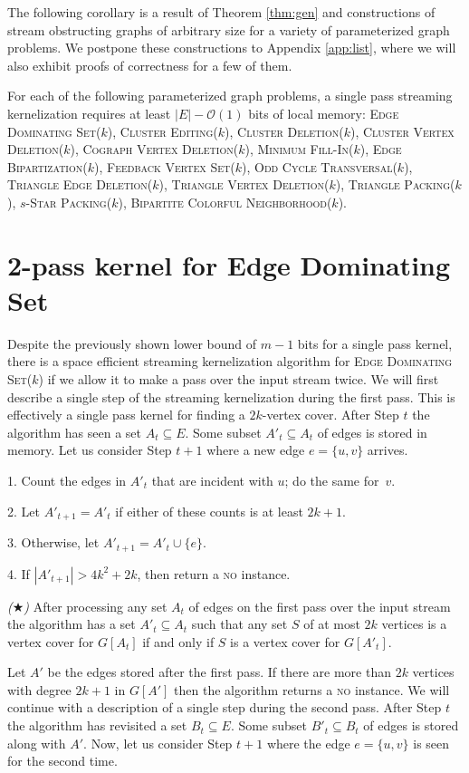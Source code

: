 \documentclass[draft,a4paper]{llncs}
\newcommand{\Oh}{\mathcal{O}}
\newcommand{\no}{\textsc{no}\xspace}
\newcommand{\EDSk}{\textsc{Edge Dominating Set($k$)}\xspace}
\newcommand{\CEk}{\textsc{Cluster Editing($k$)}\xspace}
\newcommand{\MFIk}{\textsc{Minimum Fill-In($k$)}\xspace}
\newcommand{\FBVSk}{\textsc{Feedback Vertex Set($k$)}\xspace}
\newcommand{\OCTk}{\textsc{Odd Cycle Transversal($k$)}\xspace}
\newcommand{\CVDk}{\textsc{Cluster Vertex Deletion($k$)}\xspace}
\newcommand{\CEDk}{\textsc{Cluster Deletion($k$)}\xspace}
\newcommand{\BERk}{\textsc{Edge Bipartization($k$)}\xspace}
\newcommand{\BCNk}{\textsc{Bipartite Colorful Neighborhood($k$)}\xspace}
\newcommand{\CoVDk}{\textsc{Cograph Vertex Deletion($k$)}\xspace}
\newcommand{\TEDk}{\textsc{Triangle Edge Deletion($k$)}\xspace}
\newcommand{\TVDk}{\textsc{Triangle Vertex Deletion($k$)}\xspace}
\newcommand{\TPk}{\textsc{Triangle Packing($k$)}\xspace}
\newcommand{\sSPk}{$s$-\textsc{Star Packing($k$)}\xspace}
\begin{document}
 The following corollary is a result of Theorem \ref{thm:gen} and constructions of stream obstructing graphs of arbitrary size for a variety of parameterized graph problems. We postpone these constructions to Appendix \ref{app:list}, where we will also exhibit proofs of correctness for a few of them.

\begin{corollary}
 For each of the following parameterized graph problems, a single pass streaming kernelization requires at least $|E| - \Oh(1)$ bits of local memory:
 \EDSk, \CEk, \CEDk, \CVDk, \CoVDk, \MFIk, \BERk, \FBVSk, \OCTk, \TEDk, \TVDk, \TPk, \sSPk, \BCNk.
\end{corollary}



\section{2-pass kernel for Edge Dominating Set} \label{sec:2pass}
Despite the previously shown lower bound of $m-1$ bits for a single pass kernel, there is a space efficient streaming kernelization algorithm for \textsc{Edge Dominating Set}($k$) if we allow it to make a pass over the input stream twice. We will first describe a single step of the streaming kernelization during the first pass. This is effectively a single pass kernel for finding a $2k$-vertex cover. After Step $t$ the algorithm has seen a set $A_t \subseteq E$. Some subset $A'_t \subseteq A_t$ of edges is stored in memory. Let us consider Step $t+1$ where a new edge $e = \{u, v\}$ arrives.

\smallskip

 1. Count the edges in $A'_{t}$ that are incident with $u$; do the same for~$v$.
 
 2. Let $A'_{t+1} = A'_t$ if either of these counts is at least $2k+1$.
 
 3. Otherwise, let $A'_{t+1} = A'_t \cup \{e\}$.
 
 4. If $|A'_{t+1}| > 4k^2+2k$, then return a \no instance.

\begin{lemma}\label{lem:vc} \emph{($\bigstar$)}
 After processing any set $A_t$ of edges on the first pass over the input stream the algorithm has a set $A'_t \subseteq A_t$ such
 that any set $S$ of at most $2k$ vertices is a vertex cover for $G[A_t]$ if and only if $S$ is a vertex cover for $G[A'_t]$.
\end{lemma}

Let $A'$ be the edges stored after the first pass. If there are more than $2k$ vertices with degree $2k+1$ in $G[A']$ then the algorithm returns a \no instance. We will continue with a description of a single step during the second pass. 
After Step $t$ the algorithm has revisited a set $B_t \subseteq E$. Some subset $B'_t \subseteq B_t$ of edges is stored along with
$A'$. Now, let us consider Step $t+1$ where the edge $e = \{u, v\}$ is seen for the second time.
\end{document}
